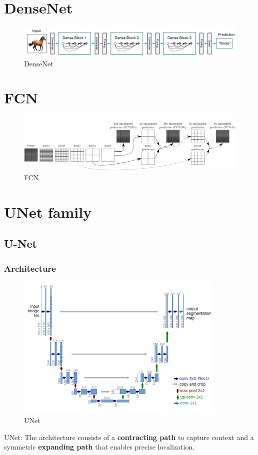 \section{DenseNet}
\begin{figure}[H]
    \centering
    \includegraphics[width=14cm]{images/densenet.png}
    \caption{DenseNet}
    \label{fig:densenet}
\end{figure}

\section{FCN}
\begin{figure}[H]
    \centering
    \includegraphics[width=14cm]{images/fcns.png}
    \caption{FCN}
    \label{fig:fcn}
\end{figure}

\section{UNet family}
\subsection{U-Net}

\subsubsection{Architecture}
\begin{figure}[H]
    \centering
    \includegraphics[width=10cm]{images/unet.png}
    \caption{UNet}
    \label{fig:unet}
\end{figure}
UNet\cite{UNet2015}: The architecture consists of a \textbf{contracting path} to capture
context and a symmetric \textbf{expanding path} that enables precise localization.

